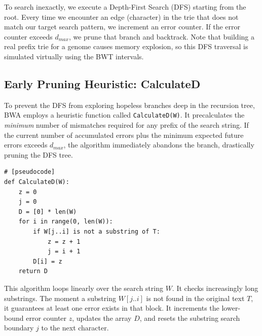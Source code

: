 To search inexactly, we execute a Depth-First Search (DFS) starting from the root. Every time we encounter an edge (character) in the trie that does not match our target search pattern, we increment an error counter. If the error counter exceeds $d_{max}$, we prune that branch and backtrack. Note that building a real prefix trie for a genome causes memory explosion, so this DFS traversal is simulated virtually using the BWT intervals.

\subsection{Early Pruning Heuristic: CalculateD}

To prevent the DFS from exploring hopeless branches deep in the recursion tree, BWA employs a heuristic function called \texttt{CalculateD(W)}. It precalculates the \textit{minimum} number of mismatches required for any prefix of the search string. If the current number of accumulated errors plus the minimum expected future errors exceeds $d_{max}$, the algorithm immediately abandons the branch, drastically pruning the DFS tree.\\

\begin{verbatim}
# [pseudocode]
def CalculateD(W):
    z = 0
    j = 0
    D = [0] * len(W)
    for i in range(0, len(W)):
        if W[j..i] is not a substring of T:
            z = z + 1
            j = i + 1
        D[i] = z
    return D
\end{verbatim}

This algorithm loops linearly over the search string $W$. It checks increasingly long substrings. The moment a substring $W[j..i]$ is not found in the original text $T$, it guarantees at least one error exists in that block. It increments the lower-bound error counter $z$, updates the array $D$, and resets the substring search boundary $j$ to the next character.

